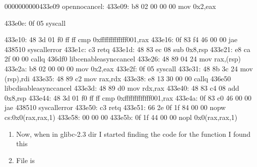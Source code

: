 \documentclass[letterpaper,10pt,english]{sphinxmanual}
\begin{document}
\begin{sphinxVerbatim}[commandchars=\\\{\}]
0000000000433e09 \PYGZlt{}\PYGZus{}open\PYGZus{}nocancel\PYGZgt{}:
433e09:   b8 02 00 00 00          mov    \PYGZdl{}0x2,\PYGZpc{}eax

433e0e:   0f 05                   syscall        \PYGZlt{}\PYGZlt{}\PYGZlt{}\PYGZlt{}\PYGZlt{}\PYGZlt{}\PYGZlt{}\PYGZlt{}\PYGZlt{}\PYGZlt{}\PYGZlt{}\PYGZlt{}\PYGZlt{}\PYGZlt{}\PYGZlt{}\PYGZlt{}\PYGZlt{}\PYGZlt{}

433e10:   48 3d 01 f0 ff ff       cmp    \PYGZdl{}0xfffffffffffff001,\PYGZpc{}rax
433e16:   0f 83 f4 46 00 00       jae    438510 \PYGZlt{}\PYGZus{}\PYGZus{}syscall\PYGZus{}error\PYGZgt{}
433e1c:   c3                      retq
433e1d:   48 83 ec 08             sub    \PYGZdl{}0x8,\PYGZpc{}rsp
433e21:   e8 ca 2f 00 00          callq  436df0 \PYGZlt{}\PYGZus{}\PYGZus{}libc\PYGZus{}enable\PYGZus{}asynccancel\PYGZgt{}
433e26:   48 89 04 24             mov    \PYGZpc{}rax,(\PYGZpc{}rsp)
433e2a:   b8 02 00 00 00          mov    \PYGZdl{}0x2,\PYGZpc{}eax
433e2f:   0f 05                   syscall
433e31:   48 8b 3c 24             mov    (\PYGZpc{}rsp),\PYGZpc{}rdi
433e35:   48 89 c2                mov    \PYGZpc{}rax,\PYGZpc{}rdx
433e38:   e8 13 30 00 00          callq  436e50 \PYGZlt{}\PYGZus{}\PYGZus{}libc\PYGZus{}disable\PYGZus{}asynccancel\PYGZgt{}
433e3d:   48 89 d0                mov    \PYGZpc{}rdx,\PYGZpc{}rax
433e40:   48 83 c4 08             add    \PYGZdl{}0x8,\PYGZpc{}rsp
433e44:   48 3d 01 f0 ff ff       cmp    \PYGZdl{}0xfffffffffffff001,\PYGZpc{}rax
433e4a:   0f 83 c0 46 00 00       jae    438510 \PYGZlt{}\PYGZus{}\PYGZus{}syscall\PYGZus{}error\PYGZgt{}
433e50:   c3                      retq
433e51:   66 2e 0f 1f 84 00 00    nopw   \PYGZpc{}cs:0x0(\PYGZpc{}rax,\PYGZpc{}rax,1)
433e58:   00 00 00
433e5b:   0f 1f 44 00 00          nopl   0x0(\PYGZpc{}rax,\PYGZpc{}rax,1)
\end{sphinxVerbatim}
\begin{enumerate}
\item {} 
Now, when in glibc-2.3 dir I started finding the code for the function
 I found this

\item {} 
File is 

\end{enumerate}
\end{document}
